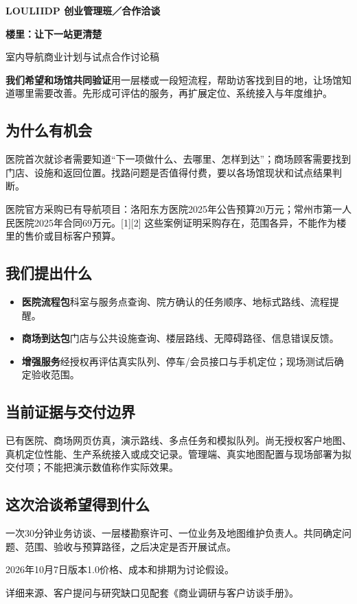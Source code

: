 \documentclass[UTF8,11pt,fontset=fandol]{ctexart}
\newcommand{\lead}[1]{\colorbox{pale}{\parbox{\dimexpr\linewidth-16pt\relax}{\vspace{6pt}#1\vspace{6pt}}}\par}
\begin{document}
{\small\color{brand}\bfseries LOULI\quad IDP 创业管理班／合作洽谈}
\vspace{9pt}\par
{\fontsize{30}{38}\selectfont\bfseries\color{ink}楼里：让下一站更清楚\par}
{\Large\color{muted}室内导航商业计划与试点合作讨论稿\par}
\vspace{12pt}
\lead{\textbf{我们希望和场馆共同验证}\quad 用一层楼或一段短流程，帮助访客找到目的地，让场馆知道哪里需要改善。先形成可评估的服务，再扩展定位、系统接入与年度维护。}
\subsection*{为什么有机会}
医院首次就诊者需要知道“下一项做什么、去哪里、怎样到达”；商场顾客需要找到门店、设施和返回位置。找路问题是否值得付费，要以各场馆现状和试点结果判断。

医院官方采购已有导航项目：洛阳东方医院2025年公告预算20万元；常州市第一人民医院2025年合同69万元。[1][2] 这些案例证明采购存在，范围各异，不能作为楼里的售价或目标客户预算。
\subsection*{我们提出什么}
\begin{itemize}
\item \textbf{医院流程包}\quad 科室与服务点查询、院方确认的任务顺序、地标式路线、流程提醒。
\item \textbf{商场到达包}\quad 门店与公共设施查询、楼层路线、无障碍路径、信息错误反馈。
\item \textbf{增强服务}\quad 经授权再评估真实队列、停车/会员接口与手机定位；现场测试后确定验收范围。
\end{itemize}
\subsection*{当前证据与交付边界}
已有医院、商场网页仿真，演示路线、多点任务和模拟队列。尚无授权客户地图、真机定位性能、生产系统接入或成交记录。管理端、真实地图配置与现场部署为拟交付项；不能把演示数值称作实际效果。
\subsection*{这次洽谈希望得到什么}
一次30分钟业务访谈、一层楼勘察许可、一位业务及地图维护负责人。共同确定问题、范围、验收与预算路径，之后决定是否开展试点。
\vfill
{\small\color{muted}2026年10月7日\quad 版本1.0\quad 价格、成本和排期为讨论假设。\par
详细来源、客户提问与研究缺口见配套《商业调研与客户访谈手册》。}
\end{document}
